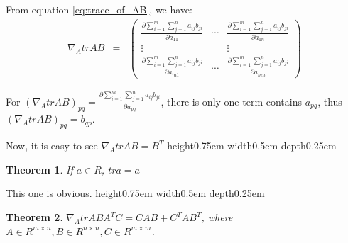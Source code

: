 \documentclass[a4paper]{book}
\newtheorem{theorem}{Theorem}[section]
\newenvironment{proof}[1][Proof]{\begin{trivlist}
\item[\hskip \labelsep {\bfseries #1}]}{\end{trivlist}}
\newcommand{\qed}{\nobreak \ifvmode \relax \else
      \ifdim\lastskip<1.5em \hskip-\lastskip
      \hskip1.5em plus0em minus0.5em \fi \nobreak
      \vrule height0.75em width0.5em depth0.25em\fi}
\begin{document}
      \begin{proof}
        From equation \ref{eq:trace_of_AB}, we have:
        \begin{eqnarray}
          \nabla_AtrAB & = &
          \begin{pmatrix}
            \frac{\partial \sum\limits^{m}_{i=1}\sum\limits^{n}_{j=1}a_{ij}b_{ji}}{\partial a_{11}} & \cdots & \frac{\partial \sum\limits^{m}_{i=1}\sum\limits^{n}_{j=1}a_{ij}b_{ji}}{\partial a_{1n}}\\
            \vdots &  & \vdots\\
            \frac{\partial \sum\limits^{m}_{i=1}\sum\limits^{n}_{j=1}a_{ij}b_{ji}}{\partial a_{m1}} & \cdots & \frac{\partial \sum\limits^{m}_{i=1}\sum\limits^{n}_{j=1}a_{ij}b_{ji}}{\partial a_{mn}}
          \end{pmatrix}
          \label{eq:nabla_trace_AB}
        \end{eqnarray}

        For $(\nabla_AtrAB)_{pq} = \frac{\partial
        \sum\limits^{m}_{i=1}\sum\limits^{n}_{j=1}a_{ij}b_{ji}}{\partial
        a_{pq}}$, there is only one term contains $a_{pq}$,
        thus $(\nabla_AtrAB)_{pq} = b_{qp}$.

        Now, it is easy to see $\nabla_AtrAB = B^T$\qed

      \end{proof}

      \begin{theorem}
        If $a \in R$, $tra = a$
      \end{theorem}

      \begin{proof}
        This one is obvious.\qed
      \end{proof}

      \begin{theorem}
        $\nabla_A trABA^TC = CAB + C^TAB^T$, where $A \in R^{m \times n}, B
        \in R^{n \times n}, C \in R^{m \times m}$.
      \end{theorem}
\end{document}
